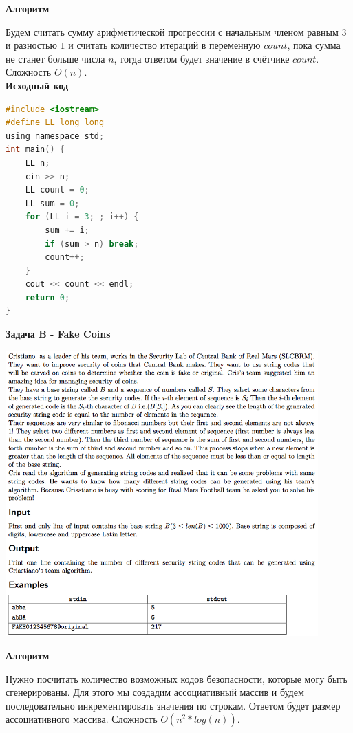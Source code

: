 \documentclass[a4paper,12pt]{article}
\begin{document}
\textbf{{\large Алгоритм}}

Будем считать сумму арифметической прогрессии с начальным членом равным $3$ и разностью $1$ и считать количество итераций в переменную $count$, пока сумма не станет больше числа $n$, тогда ответом будет значение в счётчике $count$. Сложность $O(n)$.  \\

\textbf{{\large Исходный код}} \\
\begin{lstlisting}[language=C]
#include <iostream>
#define LL long long
using namespace std;
int main() {
    LL n;
    cin >> n;
    LL count = 0;
    LL sum = 0;
    for (LL i = 3; ; i++) {
        sum += i;
        if (sum > n) break;
        count++;
    }
    cout << count << endl;
    return 0;
}
\end{lstlisting}

\newpage
\textbf{{\large Задача B - Fake Coins}}

\begin{center}
\includegraphics[width=0.9\textwidth]{CT_S02E10/CT_S02E10_B.png}\\ [1cm]
\end{center}

\textbf{{\large Алгоритм}}

Нужно посчитать количество возможных кодов безопасности, которые могу быть сгенерированы. Для этого мы создадим ассоциативный массив и будем последовательно инкрементировать значения по строкам. Ответом будет размер ассоциативного массива. Сложность $O(n^2*log(n))$.
\end{document}
